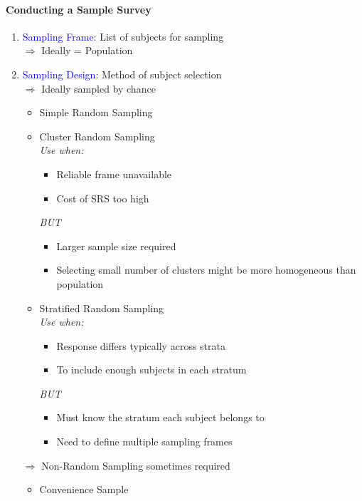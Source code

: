 \paragraph{Conducting a Sample Survey}
\begin{enumerate}
	\item \textcolor{Blue}{Sampling Frame}: List of subjects for sampling\\
		$\Rightarrow$ Ideally = Population
	\item \textcolor{Blue}{Sampling Design}: Method of subject selection\\
		$\Rightarrow$ Ideally sampled by chance
		\begin{itemize}
			\item Simple Random Sampling
			\item Cluster Random Sampling\\
				\textcolor{OliveGreen}{\textsl{Use when:}}
				\begin{itemize}
					\item Reliable frame unavailable
					\item Cost of SRS too high
				\end{itemize}
				\textcolor{Bittersweet}{\textsl{BUT}}
				\begin{itemize}
					\item Larger sample size required
					\item Selecting small number of clusters might be more
					homogeneous than population
				\end{itemize}
			\item Stratified Random Sampling\\
				\textcolor{OliveGreen}{\textsl{Use when:}}
				\begin{itemize}
					\item Response differs typically across strata
					\item To include enough subjects in each stratum
				\end{itemize}
				\textcolor{Bittersweet}{\textsl{BUT}}
				\begin{itemize}
					\item Must know the stratum each subject belongs to
					\item Need to define multiple sampling frames
				\end{itemize}
		\end{itemize}
		$\Rightarrow$ Non-Random Sampling sometimes required
		\begin{itemize}
			\item Convenience Sample

\end{itemize}
\end{enumerate}
